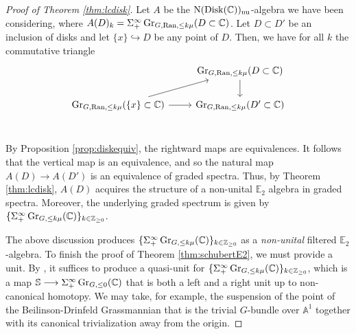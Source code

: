 \begin{proof}[Proof of Theorem \ref{thm:lcdisk}]
Let $A$ be the $\operatorname{\mathrm{N}} (\mathrm{Disk}(\mathbb{C}))_{\mathrm{nu}}$-algebra we have been considering, where $A(D)_k = \Sigma^{\infty}_+ \operatorname{\mathrm{Gr}}_{G,\operatorname{\mathrm{Ran}},\leq k\mu}(D\subset \mathbb{C})$.  Let $D \subset D'$ be an inclusion of disks and let $\{x \} \hookrightarrow D$ be any point of $D$.  Then, we have for all $k$ the commutative triangle
\begin{equation*}
\begin{tikzcd}
 & \Gra_{G,\Ran, \leq k\mu}(D\subset \mathbb{C})\arrow[d] \\
\Gra_{G,\Ran,\leq k\mu}(\{x\}\subset \mathbb{C}) \arrow[ru]\arrow[r] &\Gra_{G,\Ran,\leq k\mu}(D'\subset \mathbb{C}) \\
\end{tikzcd}
\end{equation*}

By Proposition \ref{prop:diskequiv}, the rightward maps are equivalences.  It follows that the vertical map is an equivalence, and so the natural map $A(D) \to A(D')$ is an equivalence of graded spectra.  Thus, by Theorem \ref{thm:lcdisk}, $A(D)$ acquires the structure of a non-unital $\mathbb{E}_2$ algebra in graded spectra.  Moreover, the underlying graded spectrum is given by $\{ \Sigma^{\infty}_+ \operatorname{\mathrm{Gr}}_{G,\leq k \mu}(\mathbb{C})\}_{k \in \mathbb{Z}_{\geq 0}} $.  

\begin{comment}
Proposition \ref{prop:diskequiv} simultaneously checks that our $\N (\mathrm{Disk}(\mathbb{C}))_{\mathrm{nu}}$-algebra $A$ satisfies the condition of Theorem \ref{thm:lcdisk} and identifies the underlying spectrum of the resulting non-unital $\mathbb{E}_2$-algebra as the fiber of the Beilinson-Drinfeld Grassmannian over a point of the Ran space.  This is precisely the filtered spectrum $\{ \Sigma^{\infty}_+ \Gra_{G,\leq k\mu}\}_{k \in \mathbb{Z}_{\geq 0}}$ determined by the affine Grassmannian and choice of coweight $\mu$.  
\end{comment}

The above discussion produces $\{ \Sigma^{\infty}_+ \operatorname{\mathrm{Gr}}_{G,\leq k\mu}(\mathbb{C})\}_{k \in \mathbb{Z}_{\geq 0}}$ as a \textit{non-unital} filtered $\mathbb{E}_2$-algebra.  To finish the proof of Theorem \ref{thm:schubertE2}, we must provide a unit.  By \cite[Theorem 5.4.4.5]{HA}, it suffices to produce a quasi-unit for $\{ \Sigma^{\infty}_+ \operatorname{\mathrm{Gr}}_{G,\leq k\mu}(\mathbb{C})\}_{k \in \mathbb{Z}_{\geq 0}}$, which is a map $\mathbb{S} \longrightarrow  \Sigma^{\infty}_+ \operatorname{\mathrm{Gr}}_{G,\leq 0}(\mathbb{C})$ that is both a left and a right unit up to non-canonical homotopy.  We may take, for example, the suspension of the point of the Beilinson-Drinfeld Grassmannian that is the trivial $G$-bundle over $\mathbb{A}^1$ together with its canonical trivialization away from the origin.

\end{proof}

